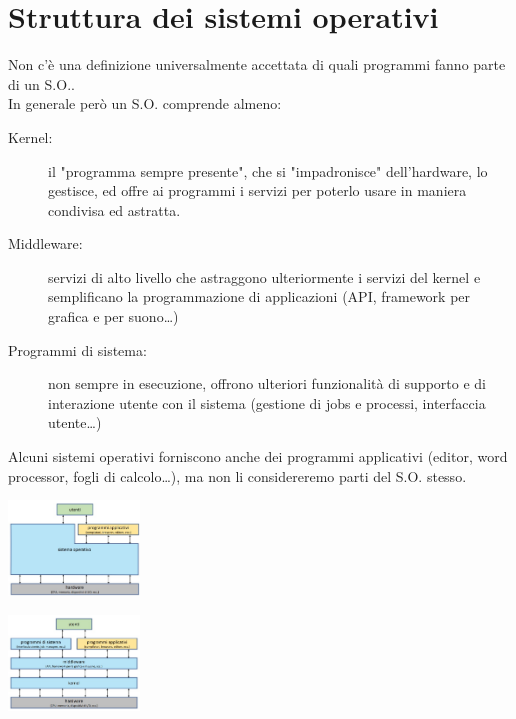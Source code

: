 \section{Struttura dei sistemi operativi}
Non c'è una definizione universalmente accettata di quali programmi fanno parte di un S.O..\\
In generale però un S.O. comprende almeno:
\begin{description}
    \item[Kernel:] il "programma sempre presente", che si "impadronisce" dell'hardware, lo gestisce, ed offre ai programmi i servizi per poterlo usare in maniera condivisa ed astratta.
    \item[Middleware:] servizi di alto livello che astraggono ulteriormente i servizi del kernel e semplificano la programmazione di applicazioni (API, framework per grafica e per suono\dots)
    \item[Programmi di sistema:] non sempre in esecuzione, offrono ulteriori funzionalità di supporto e di interazione utente con il sistema (gestione di jobs e processi, interfaccia utente\dots)
\end{description}
Alcuni sistemi operativi forniscono anche dei programmi applicativi (editor, word processor, fogli di calcolo…), ma non li considereremo parti del S.O. stesso.
\begin{center}
    \includegraphics[width=35mm]{images/SO/SO_sistema_di_elaborazione2.jpg}
\end{center}
\begin{center}
    \includegraphics[width=35mm]{images/SO/SO_sistema_di_elaborazione3.jpg}
\end{center}


